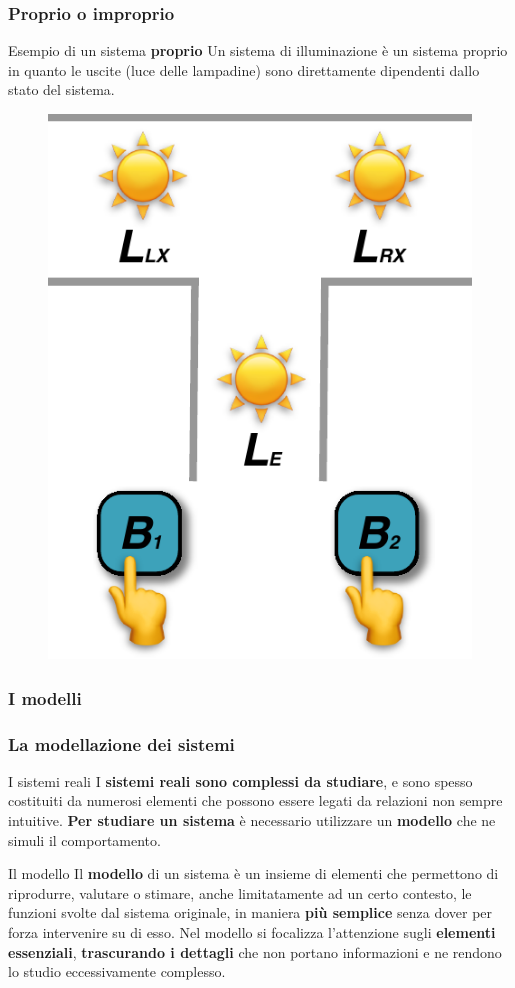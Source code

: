 \begin{frame}
	\frametitle{Proprio o improprio}
	
	\begin{block}{Esempio di un sistema \textbf{proprio}}
		Un sistema di illuminazione è un sistema proprio in quanto le uscite (luce delle lampadine) sono direttamente dipendenti dallo stato del sistema.	
		
		\begin{figure}[!htbp]
			\centering 
			\includegraphics[width=0.3\linewidth]{images/1_i_sistemi/sistemaLight.pdf}
		\end{figure}
	\end{block}
	
	
\end{frame}



\subsubsection[I modelli]{I modelli}
\begin{frame}
	\frametitle{La modellazione dei sistemi}
	\begin{block}{I sistemi reali}
		I \textbf{sistemi reali sono complessi da studiare}, e sono spesso costituiti da numerosi elementi che possono essere legati da relazioni non sempre intuitive.
		\textbf{Per studiare un sistema} è necessario utilizzare un \textbf{modello} che ne simuli il comportamento. 
	\end{block}
	
	\begin{block}{Il modello}
		Il \textbf{modello} di un sistema è un insieme di elementi che permettono di riprodurre, valutare o stimare, anche limitatamente ad un certo contesto, le funzioni svolte dal sistema originale, in maniera \textbf{più semplice} senza dover per forza intervenire su di esso.
		Nel modello si focalizza l’attenzione sugli \textbf{elementi essenziali}, \textbf{trascurando i dettagli} che non portano informazioni e ne rendono lo studio eccessivamente complesso.
	\end{block}
	
	
\end{frame}



